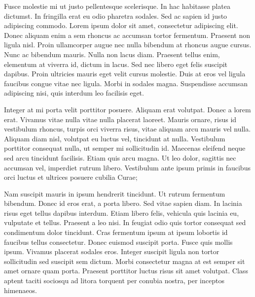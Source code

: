 Fusce molestie mi ut justo pellentesque scelerisque. In hac habitasse
platea dictumst. In fringilla erat eu odio pharetra sodales. Sed ac
sapien id justo adipiscing commodo. Lorem ipsum dolor sit amet, consectetur
adipiscing elit. Donec aliquam enim a sem rhoncus ac accumsan tortor
fermentum. Praesent non ligula nisl. Proin ullamcorper augue nec nulla
bibendum at rhoncus augue cursus. Nunc ac bibendum mauris. Nulla non
lacus diam. Praesent tellus enim, elementum at viverra id, dictum
in lacus. Sed nec libero eget felis suscipit dapibus. Proin ultricies
mauris eget velit cursus molestie. Duis at eros vel ligula faucibus
congue vitae nec ligula. Morbi in sodales magna. Suspendisse accumsan
adipiscing nisi, quis interdum leo facilisis eget.

Integer at mi porta velit porttitor posuere. Aliquam erat volutpat.
Donec a lorem erat. Vivamus vitae nulla vitae nulla placerat laoreet.
Mauris ornare, risus id vestibulum rhoncus, turpis orci viverra risus,
vitae aliquam arcu mauris vel nulla. Aliquam diam nisl, volutpat eu
luctus vel, tincidunt at nulla. Vestibulum porttitor consequat nulla,
ut semper mi sollicitudin id. Maecenas eleifend neque sed arcu tincidunt
facilisis. Etiam quis arcu magna. Ut leo dolor, sagittis nec accumsan
vel, imperdiet rutrum libero. Vestibulum ante ipsum primis in faucibus
orci luctus et ultrices posuere cubilia Curae;

Nam suscipit mauris in ipsum hendrerit tincidunt. Ut rutrum fermentum
bibendum. Donec id eros erat, a porta libero. Sed vitae sapien diam.
In lacinia risus eget tellus dapibus interdum. Etiam libero felis,
vehicula quis lacinia eu, vulputate et tellus. Praesent a leo nisi.
In feugiat odio quis tortor consequat sed condimentum dolor tincidunt.
Cras fermentum ipsum at ipsum lobortis id faucibus tellus consectetur.
Donec euismod suscipit porta. Fusce quis mollis ipsum. Vivamus placerat
sodales eros. Integer suscipit ligula non tortor sollicitudin sed
suscipit sem dictum. Morbi consectetur magna at est semper sit amet
ornare quam porta. Praesent porttitor luctus risus sit amet volutpat.
Class aptent taciti sociosqu ad litora torquent per conubia nostra,
per inceptos himenaeos. 

%

